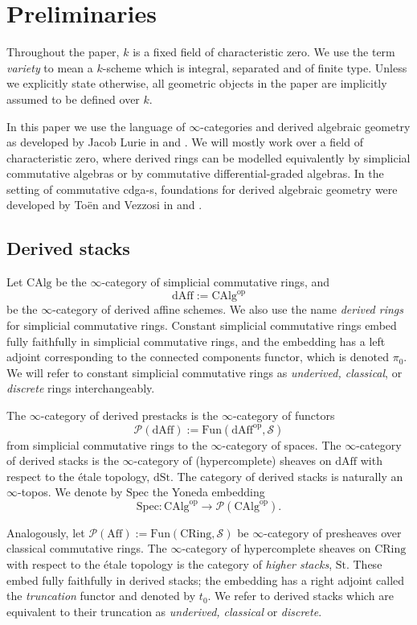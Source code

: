 \documentclass[11pt,letterpaper]{amsart}
\newcommand{\cS}{\mathcal{S}}
\newcommand{\cP}{\mathcal{P}}
\newcommand{\op}{\mathrm{op}}
\newcommand{\dSt}{\mathrm{dSt}}
\newcommand{\St}{\mathrm{St}}
\newcommand{\dAff}{\mathrm{dAff}}
\newcommand{\CAlg}{\mathrm{CAlg}}
\newcommand{\Fun}{\mathrm{Fun}}
\begin{document}
\section{Preliminaries}
\label{section:preliminaries}
Throughout the paper, $k$ is a fixed field of characteristic zero. We use the term \emph{variety} to mean a $k$-scheme which is integral, separated and of finite type. Unless we explicitly state otherwise, all geometric objects in the paper are implicitly assumed to be defined over $k$.  

In this paper we use the language of $\infty$-categories and derived algebraic geometry as developed by Jacob Lurie in \cite{HTT} and \cite{SAG}. We will mostly work over a field of characteristic zero, where derived rings can be modelled equivalently by simplicial commutative algebras or by commutative differential-graded algebras. In the setting of commutative cdga-s, foundations for derived algebraic geometry were developed by To\"en and Vezzosi in \cite{HAGI} and \cite{HAGII}.
\subsection{Derived stacks}
 Let $\CAlg$ be the $\infty$-category of simplicial commutative rings, and $$\dAff:=\CAlg^\op$$ be the $\infty$-category of derived affine schemes. We also use the name \emph{derived rings} for simplicial commutative rings. Constant simplicial commutative rings embed fully faithfully in simplicial commutative rings, and the embedding has a left adjoint corresponding to the  connected components functor, which is denoted $\pi_0$. We will refer to constant simplicial commutative rings as \emph{underived, classical}, or \emph{discrete} rings interchangeably.


The $\infty$-category of derived prestacks is the $\infty$-category of functors $$\cP(\dAff):=\Fun(\dAff^\op,\cS)$$ from simplicial commutative rings to the $\infty$-category of spaces. The $\infty$-category of derived stacks is   the $\infty$-category of (hypercomplete) sheaves on $\dAff$ with respect to the étale topology, $\dSt$. The category of derived stacks is naturally an $\infty$-topos. We denote by $\mathrm{Spec}$ the Yoneda embedding 
$$\mathrm{Spec}: 
\CAlg^\op\rightarrow\cP(\CAlg^\op).$$

Analogously, let $\cP(\mathrm{Aff}):=\Fun(\mathrm{CRing},\cS)$ be $\infty$-category of presheaves over classical commutative rings. The $\infty$-category of hypercomplete sheaves on $\mathrm{CRing}$ with respect to the \'etale topology is  the category of \emph{higher stacks}, $\St$. These embed fully faithfully in derived stacks; the embedding has a right adjoint called the \emph{truncation} functor and denoted by $t_0$. We refer to derived stacks which are equivalent to their truncation as \emph{underived, classical} or \emph{discrete}.
\end{document}
